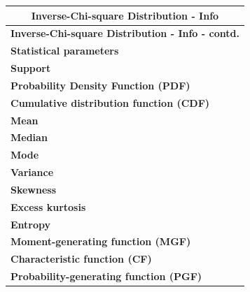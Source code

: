 \renewcommand{\arraystretch}{2}
\begin{longtable}{|m{6cm}|p{9cm}|}
    \hline
    \multicolumn{2}{|c|}{\textbf{Inverse-Chi-square Distribution - Info} \cite{wiki/Inverse-chi-squared_distribution}} \\
    \hline\endfirsthead

    \hline
    \multicolumn{2}{|c|}{\textbf{Inverse-Chi-square Distribution - Info - contd.} \cite{wiki/Inverse-chi-squared_distribution}} \\
    \hline\endhead
    
    \hline\endfoot
    \hline\endlastfoot

    \textbf{Statistical parameters} & 
    \\ \hline
    
    \textbf{Support} &
    \\ \hline

    \textbf{Probability Density Function (PDF)} & 
    \\[1ex] \hline
    
    \textbf{Cumulative distribution function (CDF)} & 
    \\ \hline

    \textbf{Mean} & 
    \\[1ex] \hline

    \textbf{Median} & 
    \\[1ex] \hline

    \textbf{Mode} & 
    \\ \hline

    \textbf{Variance} &
    \\[1ex] \hline

    \textbf{Skewness} &
    \\[1ex] \hline

    \textbf{Excess kurtosis} &
    \\[1ex] \hline

    \textbf{Entropy} &
    \\[1ex] \hline

    \textbf{Moment-generating function (MGF)} &
    \\[1ex] \hline

    \textbf{Characteristic function (CF)} &
    \\[1ex] \hline

    \textbf{Probability-generating function (PGF)} &
    \\[1ex] \hline

\end{longtable}
\renewcommand{\arraystretch}{1}












